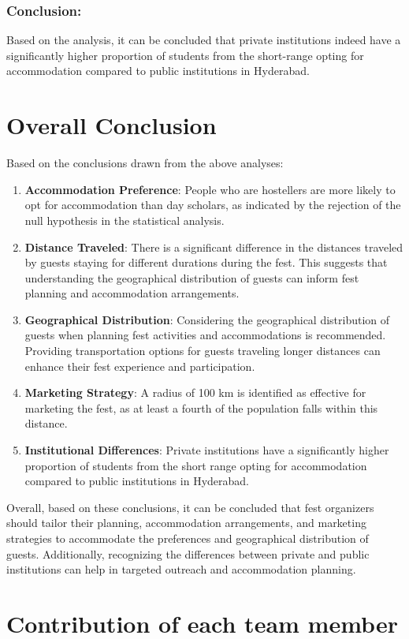 \documentclass[oneside]{book}
\begin{document}
\subsection*{Conclusion:}
Based on the analysis, it can be concluded that private institutions indeed have a significantly higher proportion of students from the short-range opting for accommodation compared to public institutions in Hyderabad.

\chapter{Overall Conclusion}
Based on the conclusions drawn from the above analyses:
\begin{enumerate}
    \item \textbf{Accommodation Preference}: People who are hostellers are more likely to opt for accommodation than day scholars, as indicated by the rejection of the null hypothesis in the statistical analysis.
    \item \textbf{Distance Traveled}: There is a significant difference in the distances traveled by guests staying for different durations during the fest. This suggests that understanding the geographical distribution of guests can inform fest planning and accommodation arrangements.
    \item \textbf{Geographical Distribution}: Considering the geographical distribution of guests when planning fest activities and accommodations is recommended. Providing transportation options for guests traveling longer distances can enhance their fest experience and participation.
    \item \textbf{Marketing Strategy}: A radius of 100 km is identified as effective for marketing the fest, as at least a fourth of the population falls within this distance.
    \item \textbf{Institutional Differences}: Private institutions have a significantly higher proportion of students from the short range opting for accommodation compared to public institutions in Hyderabad.
\end{enumerate}
Overall, based on these conclusions, it can be concluded that fest organizers should tailor their planning, accommodation arrangements, and marketing strategies to accommodate the preferences and geographical distribution of guests. Additionally, recognizing the differences between private and public institutions can help in targeted outreach and accommodation planning.

\chapter{Contribution of each team member}
    \LARGE 
\end{document}

